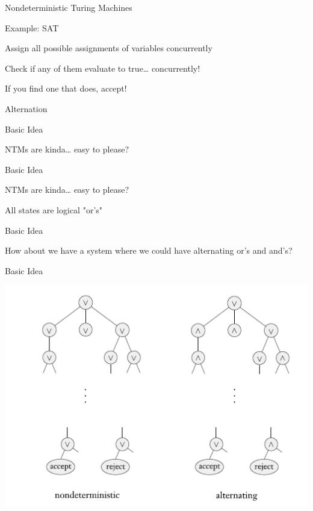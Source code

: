 \documentclass[presentation]{beamer}
\begin{document}
\begin{frame}[label={sec:org950a81c}]{Nondeterministic Turing Machines}
\begin{block}{Example: SAT}
\begin{block}{Assign all possible assignments of variables concurrently}
\end{block}
\begin{block}{Check if any of them evaluate to true\ldots{} concurrently!}
\end{block}
\begin{block}{If you find one that does, accept!}
\end{block}
\end{block}
\end{frame}
\begin{frame}[label={sec:orgf916c10}]{Alternation}
\begin{block}{Basic Idea}
\begin{block}{NTMs are kinda\ldots{} easy to please?}
\end{block}
\end{block}
\begin{block}{Basic Idea}
\begin{block}{NTMs are kinda\ldots{} easy to please?}
\end{block}
\begin{block}{All states are logical "or's"}
\end{block}
\end{block}
\begin{block}{Basic Idea}
\begin{block}{How about we have a system where we could have alternating or's and and's?}
\end{block}
\end{block}
\begin{block}{Basic Idea}
\begin{center}
\includegraphics[width=.9\linewidth]{./atm_tree.png}

\end{center}
\end{block}
\end{frame}
\end{document}
